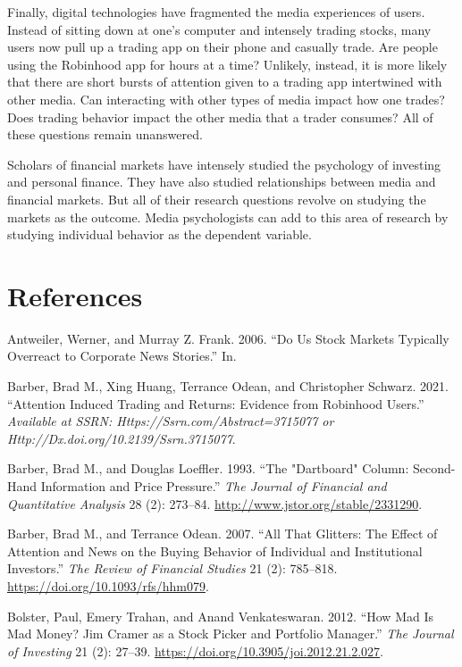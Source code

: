 \documentclass[12pt,]{article}
\begin{document}
Finally, digital technologies have fragmented the media experiences of
users. Instead of sitting down at one's computer and intensely trading
stocks, many users now pull up a trading app on their phone and casually
trade. Are people using the Robinhood app for hours at a time? Unlikely,
instead, it is more likely that there are short bursts of attention
given to a trading app intertwined with other media. Can interacting
with other types of media impact how one trades? Does trading behavior
impact the other media that a trader consumes? All of these questions
remain unanswered.

Scholars of financial markets have intensely studied the psychology of
investing and personal finance. They have also studied relationships
between media and financial markets. But all of their research questions
revolve on studying the markets as the outcome. Media psychologists can
add to this area of research by studying individual behavior as the
dependent variable.

\hypertarget{references}{%
\section*{References}\label{references}}

\hypertarget{refs}{}
\leavevmode\hypertarget{ref-antweiler2006}{}%
Antweiler, Werner, and Murray Z. Frank. 2006. ``Do Us Stock Markets
Typically Overreact to Corporate News Stories.'' In.

\leavevmode\hypertarget{ref-barber2021}{}%
Barber, Brad M., Xing Huang, Terrance Odean, and Christopher Schwarz.
2021. ``Attention Induced Trading and Returns: Evidence from Robinhood
Users.'' \emph{Available at SSRN: Https://Ssrn.com/Abstract=3715077 or
Http://Dx.doi.org/10.2139/Ssrn.3715077}.

\leavevmode\hypertarget{ref-barber1993}{}%
Barber, Brad M., and Douglas Loeffler. 1993. ``The "Dartboard" Column:
Second-Hand Information and Price Pressure.'' \emph{The Journal of
Financial and Quantitative Analysis} 28 (2): 273--84.
\url{http://www.jstor.org/stable/2331290}.

\leavevmode\hypertarget{ref-barber2007}{}%
Barber, Brad M., and Terrance Odean. 2007. ``All That Glitters: The
Effect of Attention and News on the Buying Behavior of Individual and
Institutional Investors.'' \emph{The Review of Financial Studies} 21
(2): 785--818. \url{https://doi.org/10.1093/rfs/hhm079}.

\leavevmode\hypertarget{ref-bolster2012}{}%
Bolster, Paul, Emery Trahan, and Anand Venkateswaran. 2012. ``How Mad Is
Mad Money? Jim Cramer as a Stock Picker and Portfolio Manager.''
\emph{The Journal of Investing} 21 (2): 27--39.
\url{https://doi.org/10.3905/joi.2012.21.2.027}.
\end{document}
